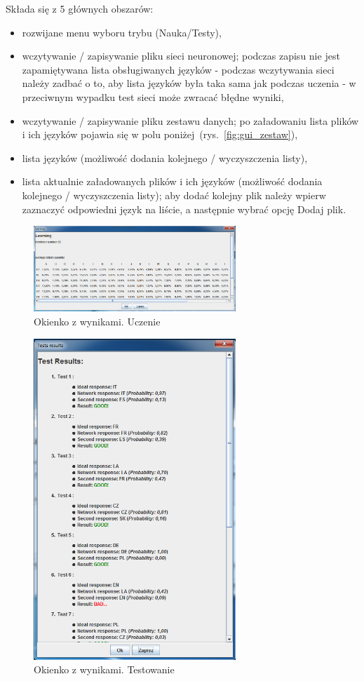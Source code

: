 \documentclass[journal]{IEEEtran}
\begin{document}
Składa się z 5 głównych obszarów:
\begin{itemize}
 \item rozwijane menu wyboru trybu (Nauka/Testy),
 \item wczytywanie / zapisywanie pliku sieci neuronowej; podczas zapisu nie jest zapamiętywana lista obsługiwanych języków
- podczas wczytywania sieci należy zadbać o to, aby lista języków była taka sama jak podczas uczenia - w przeciwnym wypadku
test sieci może zwracać błędne wyniki,
 \item wczytywanie / zapisywanie pliku zestawu danych; po załadowaniu lista plików i ich języków pojawia się w polu
poniżej~(rys.~\ref{fig:gui_zestaw}),
 \item lista języków (możliwość dodania kolejnego / wyczyszczenia listy),
 \item lista aktualnie załadowanych plików i ich języków (możliwość dodania kolejnego / wyczyszczenia listy); aby dodać
kolejny plik należy wpierw zaznaczyć odpowiedni język na liście, a następnie wybrać opcję Dodaj plik.
\end{itemize}

\begin{figure}[!t]
\centering
\includegraphics[width=3in]{Learning}
\caption{Okienko z wynikami. Uczenie}
\label{fig:learning}
\end{figure}

\begin{figure}[!t]
\centering
\includegraphics[width=3in]{Testing}
\caption{Okienko z wynikami. Testowanie}
\label{fig:testing}
\end{figure}
\end{document}
